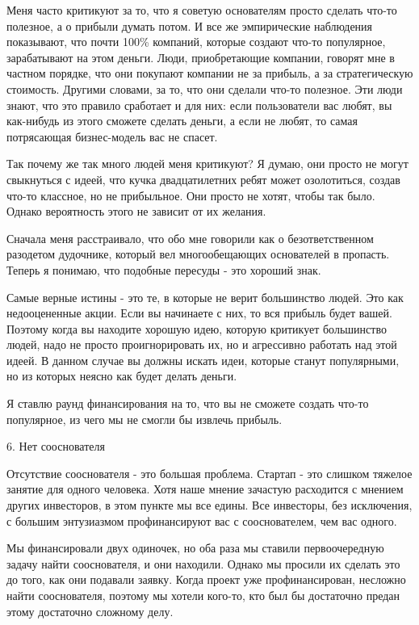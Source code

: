\documentclass[ebook,12pt,oneside,openany]{memoir}
\begin{document}
Меня часто критикуют за то, что я советую основателям просто сделать
что-то полезное, а о прибыли думать потом. И все же эмпирические
наблюдения показывают, что почти 100\% компаний, которые создают
что-то популярное, зарабатывают на этом деньги. Люди, приобретающие
компании, говорят мне в частном порядке, что они покупают компании не
за прибыль, а за стратегическую стоимость. Другими словами, за то, что
они сделали что-то полезное. Эти люди знают, что это правило сработает
и для них: если пользователи вас любят, вы как-нибудь из этого сможете
сделать деньги, а если не любят, то самая потрясающая бизнес-модель
вас не спасет.

Так почему же так много людей меня критикуют? Я думаю, они просто не
могут свыкнуться с идеей, что кучка двадцатилетних ребят может
озолотиться, создав что-то классное, но не прибыльное. Они просто не
хотят, чтобы так было. Однако вероятность этого не зависит от их
желания.

Сначала меня расстраивало, что обо мне говорили как о безответственном
разодетом дудочнике, который вел многообещающих основателей в
пропасть. Теперь я понимаю, что подобные пересуды - это хороший знак.

Самые верные истины - это те, в которые не верит большинство людей.
Это как недооцененные акции. Если вы начинаете с них, то вся прибыль
будет вашей. Поэтому когда вы находите хорошую идею, которую критикует
большинство людей, надо не просто проигнорировать их, но и агрессивно
работать над этой идеей. В данном случае вы должны искать идеи,
которые станут популярными, но из которых неясно как будет делать
деньги.

Я ставлю раунд финансирования на то, что вы не сможете создать что-то
популярное, из чего мы не смогли бы извлечь прибыль.

6. Нет сооснователя

Отсутствие сооснователя - это большая проблема. Стартап - это слишком
тяжелое занятие для одного человека. Хотя наше мнение зачастую
расходится с мнением других инвесторов, в этом пункте мы все едины.
Все инвесторы, без исключения, с большим энтузиазмом профинансируют
вас с сооснователем, чем вас одного.

Мы финансировали двух одиночек, но оба раза мы ставили первоочередную
задачу найти сооснователя, и они находили. Однако мы просили их
сделать это до того, как они подавали заявку. Когда проект уже
профинансирован, несложно найти сооснователя, поэтому мы хотели
кого-то, кто был бы достаточно предан этому достаточно сложному делу.
\end{document}
